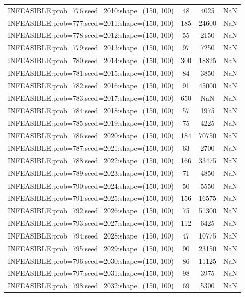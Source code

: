 \begin{longtable}{lccc}
INFEASIBLE:prob=776:seed=2010:shape=(150, 100) &    48 &  4025 &    NaN \\
INFEASIBLE:prob=777:seed=2011:shape=(150, 100) &   185 & 24600 &    NaN \\
INFEASIBLE:prob=778:seed=2012:shape=(150, 100) &    55 &  2150 &    NaN \\
INFEASIBLE:prob=779:seed=2013:shape=(150, 100) &    97 &  7250 &    NaN \\
INFEASIBLE:prob=780:seed=2014:shape=(150, 100) &   300 & 18825 &    NaN \\
INFEASIBLE:prob=781:seed=2015:shape=(150, 100) &    84 &  3850 &    NaN \\
INFEASIBLE:prob=782:seed=2016:shape=(150, 100) &    91 & 45000 &    NaN \\
INFEASIBLE:prob=783:seed=2017:shape=(150, 100) &   650 &   NaN &    NaN \\
INFEASIBLE:prob=784:seed=2018:shape=(150, 100) &    57 &  1975 &    NaN \\
INFEASIBLE:prob=785:seed=2019:shape=(150, 100) &    75 &  4225 &    NaN \\
INFEASIBLE:prob=786:seed=2020:shape=(150, 100) &   184 & 70750 &    NaN \\
INFEASIBLE:prob=787:seed=2021:shape=(150, 100) &    63 &  2700 &    NaN \\
INFEASIBLE:prob=788:seed=2022:shape=(150, 100) &   166 & 33475 &    NaN \\
INFEASIBLE:prob=789:seed=2023:shape=(150, 100) &    71 &  4850 &    NaN \\
INFEASIBLE:prob=790:seed=2024:shape=(150, 100) &    50 &  5550 &    NaN \\
INFEASIBLE:prob=791:seed=2025:shape=(150, 100) &   156 & 16575 &    NaN \\
INFEASIBLE:prob=792:seed=2026:shape=(150, 100) &    75 & 51300 &    NaN \\
INFEASIBLE:prob=793:seed=2027:shape=(150, 100) &   112 &  6425 &    NaN \\
INFEASIBLE:prob=794:seed=2028:shape=(150, 100) &    47 & 10775 &    NaN \\
INFEASIBLE:prob=795:seed=2029:shape=(150, 100) &    90 & 23150 &    NaN \\
INFEASIBLE:prob=796:seed=2030:shape=(150, 100) &    86 & 11125 &    NaN \\
INFEASIBLE:prob=797:seed=2031:shape=(150, 100) &    98 &  3975 &    NaN \\
INFEASIBLE:prob=798:seed=2032:shape=(150, 100) &    69 &  5300 &    NaN \\

\end{longtable}
